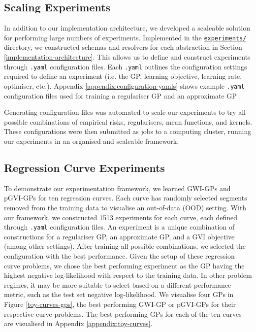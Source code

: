 \documentclass{article}
\def\code#1{\texttt{#1}}
\numberwithin{equation}{section}
\begin{document}
\subsection{Scaling Experiments}
In addition to our implementation architecture, we developed a scaleable solution for performing large numbers of experiments.
Implemented in the \href{https://github.com/jswu18/generalised-variational-inference-for-gaussian-processes/tree/main/experiments}{\code{experiments/}} directory, we constructed schemas and resolvers for each abstraction in Section \ref{implementation-architecture}.
This allows us to define and construct experiments through \code{.yaml} configuration files.
Each \code{.yaml} outlines the configuration settings required to define an experiment (i.e. the GP, learning objective, learning rate, optimiser, etc.).
Appendix \ref{appendix:configuration-yamls} shows example \code{.yaml} configuration files used for training a regulariser GP and an approximate GP .

Generating configuration files was automated to scale our experiments to try all possible combinations of empirical risks, regularisers, mean functions, and kernels. These configurations were then submitted as jobs to a computing cluster, running our experiments in an organised and scaleable framework.

\subsection{Regression Curve Experiments}
To demonstrate our experimentation framework, we learned GWI-GPs and pGVI-GPs for ten regression curves. 
Each curve has randomly selected segments removed from the training data to visualise an out-of-data (OOD) setting.
With our framework, we constructed 1513 experiments for each curve, each defined through \code{.yaml} configuration files. 
An experiment is a unique combination of constructions for a regulariser GP, an approximate GP, and a GVI objective (among other settings). 
After training all possible combinations, we selected the configuration with the best performance. 
Given the setup of these regression curve problems, we chose the best performing experiment as the GP having the highest negative log-likelihood with respect to the training data. 
In other problem regimes, it may be more suitable to select based on a different performance metric, such as the test set negative log-likelihood. 
We visualise four GPs in Figure \ref{toy-curves-gps}, the best performing GWI-GP or pGVI-GPs for their respective curve problems.
The best performing GPs for each of the ten curves are visualised in Appendix \ref{appendix:toy-curves}.
\end{document}
